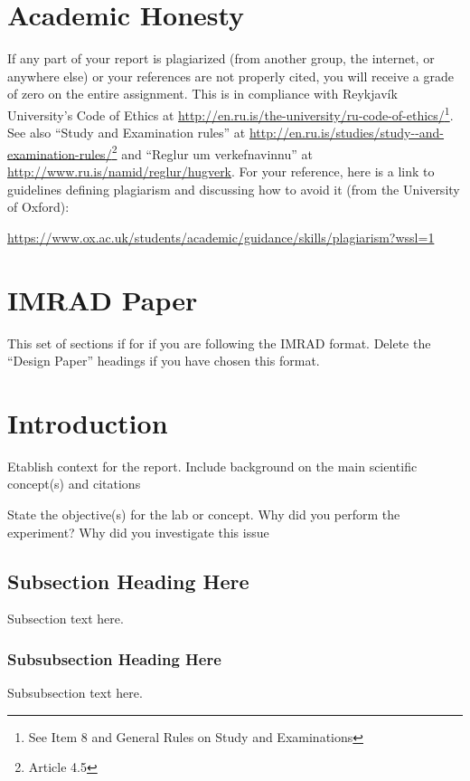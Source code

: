 \documentclass[conference,a4paper]{IEEEtran}
\begin{document}
\section*{Academic Honesty}
If any part of your report is plagiarized (from another group, the internet, or anywhere else) or your references are not properly cited, you will receive a grade of zero on the entire assignment.
This is in compliance with Reykjavík University's Code of Ethics at \url{http://en.ru.is/the-university/ru-code-of-ethics/}\footnote{See Item 8 and General Rules on Study and Examinations}.
See also ``Study and Examination rules'' at \url{http://en.ru.is/studies/study--and-examination-rules/}\footnote{Article 4.5}
and ``Reglur um verkefnavinnu'' at \url{http://www.ru.is/namid/reglur/hugverk}.
For your reference, here is a link to guidelines defining plagiarism and discussing how to avoid it (from the
University of Oxford):

\url{https://www.ox.ac.uk/students/academic/guidance/skills/plagiarism?wssl=1}


\section*{IMRAD Paper}
This set of sections if for if you are following the IMRAD format.
Delete the ``Design Paper'' headings if you have chosen this format.

\section{Introduction}\label{sec:intro1}
Etablish context for the report.
Include background on the main scientific concept(s) and citations

State the objective(s) for the lab or concept.
Why did you perform the experiment?
Why did you investigate this issue
\subsection{Subsection Heading Here}\label{sec:subhead1}
Subsection text here.


\subsubsection{Subsubsection Heading Here}\label{sec:subsubhead1}
Subsubsection text here.
\end{document}
